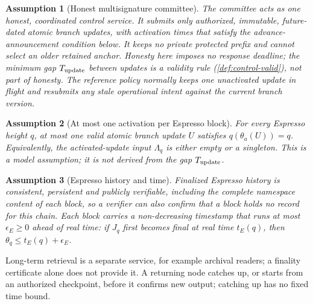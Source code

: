 \documentclass[11pt,a4paper]{article}
\newtheorem{assumption}[assumption]{Assumption}
\begin{document}
\begin{assumption}[Honest multisignature committee]
\label{ass:committee}
The committee acts as one honest, coordinated control service. It
submits only authorized, immutable, future-dated atomic branch updates, with
activation times that satisfy the advance-announcement condition below. It keeps no private protected prefix and cannot select
an older retained anchor. Honesty here imposes no response deadline; the
minimum gap $T_{\rm update}$ between updates is a validity rule
(\cref{def:control-valid}), not part of honesty.  The reference policy
normally keeps one unactivated update in flight and resubmits any stale
operational intent against the current branch version.
\end{assumption}

\begin{assumption}[At most one activation per Espresso block]
\label{ass:single-activation}
For every Espresso height $q$, at most one valid atomic branch update
$U$ satisfies $q(\theta_a(U))=q$. Equivalently, the activated-update
input $\Lambda_q$ is either empty or a singleton. This is a model
assumption; it is not derived from the gap $T_{\rm update}$.
\end{assumption}

\begin{assumption}[Espresso history and time]
\label{ass:espresso}
Finalized Espresso history is consistent, persistent and publicly
verifiable, including the complete namespace content of each block, so a
verifier can also confirm that a block holds no record for this chain.
Each block carries a non-decreasing timestamp that runs at most
$\epsilon_E\ge0$ ahead of real time: if $J_q$ first becomes final at real
time $t_E(q)$, then $\theta_q\le t_E(q)+\epsilon_E$.
\end{assumption}
Long-term retrieval is a separate service, for example archival readers;
a finality certificate alone does not provide it. A returning node
catches up, or starts from an authorized checkpoint, before it confirms
new output; catching up has no fixed time bound.
\end{document}
